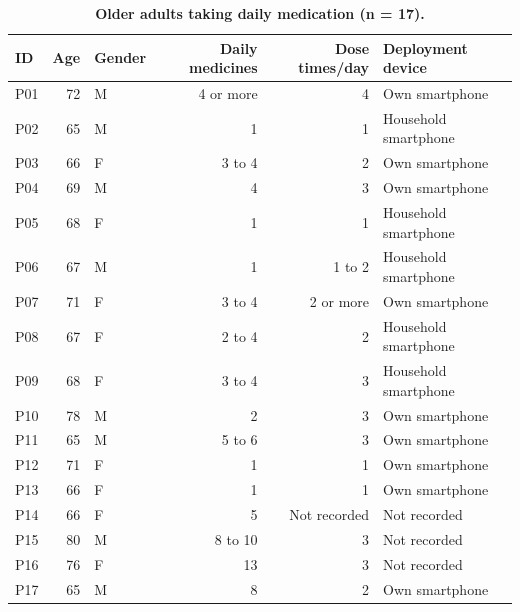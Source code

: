 \begin{table}[t]
  \caption{\textbf{Older adults taking daily medication (n = 17).}}
  \label{tab:older-adults}
  \small
  \begin{tabular}{lrlrrl}
    \toprule
    ID & Age & Gender & Daily medicines & Dose times/day & Deployment device \\
    \midrule
    P01 & 72 & M & 4 or more & 4 & Own smartphone \\
    P02 & 65 & M & 1 & 1 & Household smartphone \\
    P03 & 66 & F & 3 to 4 & 2 & Own smartphone \\
    P04 & 69 & M & 4 & 3 & Own smartphone \\
    P05 & 68 & F & 1 & 1 & Household smartphone \\
    P06 & 67 & M & 1 & 1 to 2 & Household smartphone \\
    P07 & 71 & F & 3 to 4 & 2 or more & Own smartphone \\
    P08 & 67 & F & 2 to 4 & 2 & Household smartphone \\
    P09 & 68 & F & 3 to 4 & 3 & Household smartphone \\
    P10 & 78 & M & 2 & 3 & Own smartphone \\
    P11 & 65 & M & 5 to 6 & 3 & Own smartphone \\
    P12 & 71 & F & 1 & 1 & Own smartphone \\
    P13 & 66 & F & 1 & 1 & Own smartphone \\
    P14 & 66 & F & 5 & Not recorded & Not recorded \\
    P15 & 80 & M & 8 to 10 & 3 & Not recorded \\
    P16 & 76 & F & 13 & 3 & Not recorded \\
    P17 & 65 & M & 8 & 2 & Own smartphone \\
    \bottomrule
  \end{tabular}
\end{table}


